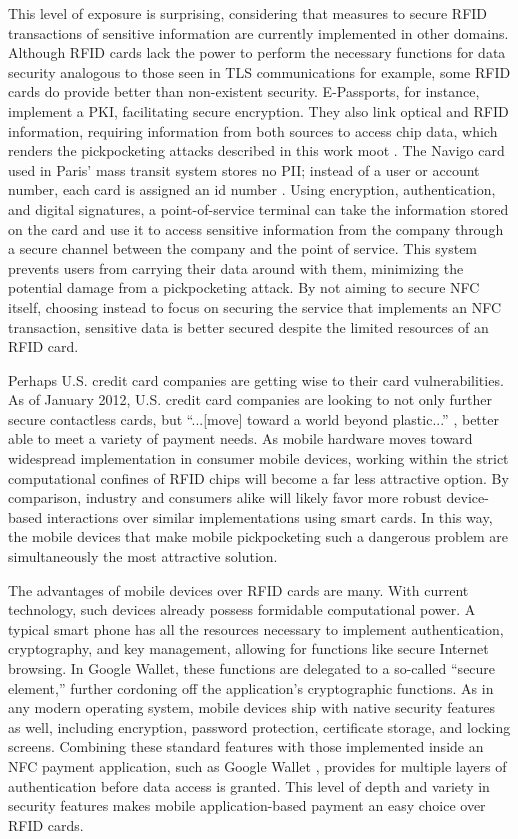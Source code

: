 \documentclass{IEEEtran}
\begin{document}
This level of exposure is surprising, considering that measures to secure RFID transactions of sensitive information are currently implemented in other domains.  Although RFID cards lack the power to perform the necessary functions for data security analogous to those seen in TLS communications for example, some RFID cards do provide better than non-existent security.  E-Passports, for instance, implement a PKI, facilitating secure encryption. They also link optical and RFID information, requiring information from both sources to access chip data, which renders the pickpocketing attacks described in this work moot \cite{security-privacy-epassports}.  The Navigo card used in Paris' mass transit system stores no PII; instead of a user or account number, each card is assigned an id number \cite{bt-hacking-nfc-ccs}.  Using encryption, authentication, and digital signatures, a point-of-service terminal can take the information stored on the card and use it to access sensitive information from the company through a secure channel between the company and the point of service.  This system prevents users from carrying their data around with them, minimizing the potential damage from a pickpocketing attack.  By not aiming to secure NFC itself, choosing instead to focus on securing the service that implements an NFC transaction, sensitive data is better secured despite the limited resources of an RFID card.  

Perhaps U.S. credit card companies are getting wise to their card vulnerabilities.  As of January 2012, U.S. credit card companies are looking to not only further secure contactless cards, but ``...[move] toward a world beyond plastic...'' \cite{emv-upgrade}, better able to meet a variety of payment needs.  As mobile hardware moves toward widespread implementation in consumer mobile devices, working within the strict computational confines of RFID chips will become a far less attractive option. By comparison, industry and consumers alike will likely favor more robust device-based interactions over similar implementations using smart cards.  In this way, the mobile devices that make mobile pickpocketing such a dangerous problem are simultaneously the most attractive solution.     

The advantages of mobile devices over RFID cards are many.  With current technology, such devices already possess formidable computational power.  A typical smart phone has all the resources necessary to implement authentication, cryptography, and key management, allowing for functions like secure Internet browsing.  In Google Wallet, these functions are delegated to a so-called ``secure element,'' further cordoning off the application's cryptographic functions.  As in any modern operating system, mobile devices ship with native security features as well, including encryption, password protection, certificate storage, and locking screens.  Combining these standard features with those implemented inside an NFC payment application, such as Google Wallet \cite{google-wallet-security-1}, provides for multiple layers of authentication before data access is granted.  This level of depth and variety in security features makes mobile application-based payment an easy choice over RFID cards.  
\end{document}
